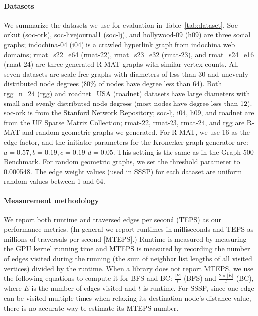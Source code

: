 \documentclass[format=acmsmall,review=false,screen=true]{acmart}
\begin{document}
\paragraph{Datasets}
We summarize the datasets we use for evaluation in
Table~\ref{tab:dataset}. Soc-orkut (soc-ork), soc-livejournal1
(soc-lj), and hollywood-09 (h09) are three social graphs; indochina-04
(i04) is a crawled hyperlink graph from indochina web domains;
rmat\_s22\_e64 (rmat-22), rmat\_s23\_e32 (rmat-23), and rmat\_s24\_e16
(rmat-24) are three generated R-MAT graphs with similar vertex counts.
All seven datasets are scale-free graphs with diameters of less than
30 and unevenly distributed node degrees (80\% of nodes have degree
less than 64). Both rgg\_n\_24 (rgg) and roadnet\_USA (roadnet)
datasets have large diameters with small and evenly distributed node
degrees (most nodes have degree less than 12). soc-ork is from the
Stanford Network Repository; soc-lj, i04, h09, and roadnet are from
the UF Sparse Matrix Collection; rmat-22, rmat-23, rmat-24, and rgg
are R-MAT and random geometric graphs we generated. For R-MAT, we use
16 as the edge factor, and the initiator parameters for the Kronecker
graph generator are: $a=0.57,b=0.19,c=0.19,d=0.05$. This setting is
the same as in the Graph 500 Benchmark. For random geometric graphs,
we set the threshold parameter to 0.000548. The edge weight values
(used in SSSP) for each dataset are uniform random values between 1
and 64.

\paragraph{Measurement methodology}
We report both runtime and traversed edges per second (TEPS) as our
performance metrics. (In general we report runtimes in milliseconds
and TEPS as millions of traversals per second [MTEPS].) Runtime is
measured by measuring the GPU kernel running time and MTEPS is
measured by recording the number of edges visited during the running
(the sum of neighbor list lengths of all visited vertices) divided by
the runtime. When a library does not report MTEPS, we use the
following equations to compute it for BFS and BC: $\frac{|E|}{t}$
(BFS) and $\frac{2\times|E|}{t}$ (BC), where $E$ is the number of
edges visited and $t$ is runtime. For SSSP, since one edge can be
visited multiple times when relaxing its destination node's distance
value, there is no accurate way to estimate its MTEPS number.
\end{document}
